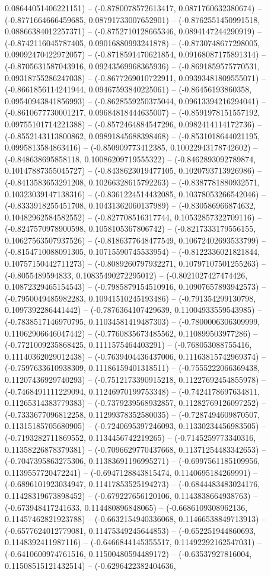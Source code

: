 0.08644051406221151) -- (-0.8780078572613417, 0.0871760632380674) -- (-0.8771664666459685, 0.08791733007652901) -- (-0.8762551450991518, 0.08866384012257371) -- (-0.8752710128665346, 0.0894147244290919) -- (-0.8742116045787405, 0.09016880993241878) -- (-0.8730748677298005, 0.09092470422972057) -- (-0.8718591470621854, 0.09168087175891314) -- (-0.8705631587043916, 0.09243569968365936) -- (-0.8691859575770531, 0.09318755286247038) -- (-0.8677269010722911, 0.09393481809555071) -- (-0.8661856114241944, 0.09467593840225061) -- (-0.86456193860358, 0.09540943841856993) -- (-0.8628559250375044, 0.09613394216294041) -- (-0.8610677730001217, 0.09684818444635007) -- (-0.8591978151557192, 0.09755101714221388) -- (-0.8572464884547296, 0.0982414114172736) -- (-0.8552143113800862, 0.09891845688398468) -- (-0.8531018644021195, 0.0995813584863416) -- (-0.850909773412385, 0.10022943178742602) -- (-0.848638695858118, 0.10086209719555322) -- (-0.8462893092789874, 0.10147887355045727) -- (-0.8438623019477105, 0.1020793713926986) -- (-0.8413583653291208, 0.10266328615792263) -- (-0.8387781880932571, 0.10323039147138316) -- (-0.8361224514432085, 0.10378053266542046) -- (-0.8333918255451708, 0.10431362060137989) -- (-0.830586966874632, 0.10482962584582552) -- (-0.827708516317744, 0.10532857322709116) -- (-0.8247570978900598, 0.1058105367806742) -- (-0.8217333179556155, 0.10627563507937526) -- (-0.8186377648477549, 0.10672402693533799) -- (-0.8154710088091305, 0.10715590745533954) -- (-0.8122336021821844, 0.10757150442711273) -- (-0.8089260797932271, 0.10797107501255263) -- (-0.8055489594833, 0.10835490272295012) -- (-0.8021027427474426, 0.10872329465154543) -- (-0.7985879154510916, 0.10907657893942573) -- (-0.7950049485982283, 0.10941510245193486) -- (-0.791354299130798, 0.1097392286441442) -- (-0.7876364107429639, 0.11004933559543985) -- (-0.7838517146970795, 0.11034581419487303) -- (-0.7800006306309999, 0.11062906646047442) -- (-0.7760835673485562, 0.110899503977286) -- (-0.7721009235868425, 0.1111575464403291) -- (-0.768053088755416, 0.11140362029012438) -- (-0.7639404436437006, 0.11163815742969374) -- (-0.7597633610938309, 0.11186159401318511) -- (-0.7555222066369438, 0.11207436929740293) -- (-0.7512173390915218, 0.11227692454855978) -- (-0.7468491111229094, 0.11246970199753348) -- (-0.7424178697634811, 0.11265314383779383) -- (-0.7379239568932857, 0.11282769126097252) -- (-0.7333677096812258, 0.11299378352580035) -- (-0.7287494609870507, 0.11315185705680905) -- (-0.7240695397246093, 0.11330234456983505) -- (-0.7193282711869552, 0.1134456742219265) -- (-0.7145259773340316, 0.11358226878379381) -- (-0.7096629770437668, 0.11371254483342653) -- (-0.7047395863275306, 0.11383691196995271) -- (-0.6997561185109956, 0.1139557720472241) -- (-0.6947128843815474, 0.1140695184269991) -- (-0.6896101923034947, 0.11417853525194273) -- (-0.6844483483024176, 0.11428319673898452) -- (-0.679227656120106, 0.1143838664938763) -- (-0.673948417241633, 0.114480896848065) -- (-0.6686109308962136, 0.11457462821923788) -- (-0.6632154940336068, 0.11466538849713913) -- (-0.6577624012779081, 0.11475349245644853) -- (-0.652251944860693, 0.1148392411987116) -- (-0.6466844145355517, 0.11492292162547031) -- (-0.6410600974761516, 0.11500480594489172) -- (-0.63537927816004, 0.11508515121432514) -- (-0.6296422382404636, 